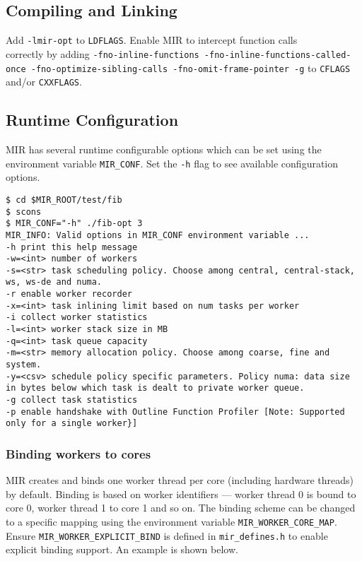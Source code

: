 \documentclass[11pt,a4paper]{article}
\begin{document}
\subsection{Compiling and Linking}\label{compiling-and-linking}

Add \texttt{-lmir-opt} to \texttt{LDFLAGS}. Enable MIR to intercept function calls\\correctly by adding \texttt{{\footnotesize -fno-inline-functions -fno-inline-functions-called-once -fno-optimize-sibling-calls -fno-omit-frame-pointer -g}}  to \texttt{CFLAGS} and/or \texttt{CXXFLAGS}.

\subsection{Runtime Configuration}\label{runtime-configuration}

MIR has several runtime configurable options which can be set using the environment variable \texttt{MIR\_CONF}. Set the \texttt{-h} flag to see available configuration options.

\begin{lstlisting}[style=MyInputStyle]
$ cd $MIR_ROOT/test/fib
$ scons 
$ MIR_CONF="-h" ./fib-opt 3
MIR_INFO: Valid options in MIR_CONF environment variable ...
-h print this help message
-w=<int> number of workers
-s=<str> task scheduling policy. Choose among central, central-stack, ws, ws-de and numa.
-r enable worker recorder
-x=<int> task inlining limit based on num tasks per worker
-i collect worker statistics
-l=<int> worker stack size in MB
-q=<int> task queue capacity
-m=<str> memory allocation policy. Choose among coarse, fine and system.
-y=<csv> schedule policy specific parameters. Policy numa: data size in bytes below which task is dealt to private worker queue.
-g collect task statistics
-p enable handshake with Outline Function Profiler [Note: Supported only for a single worker}]
\end{lstlisting}

\subsubsection{Binding workers to cores}\label{binding-workers-to-cores}

MIR creates and binds one worker thread per core (including hardware threads) by default. Binding is based on worker identifiers --- worker thread 0 is bound to core 0, worker thread 1 to core 1 and so on. The binding scheme can be changed to a specific mapping using the environment variable \texttt{MIR\_WORKER\_CORE\_MAP}. Ensure \texttt{MIR\_WORKER\_EXPLICIT\_BIND} is defined in \texttt{mir\_defines.h} to enable explicit binding support. An example is shown below.
\end{document}
